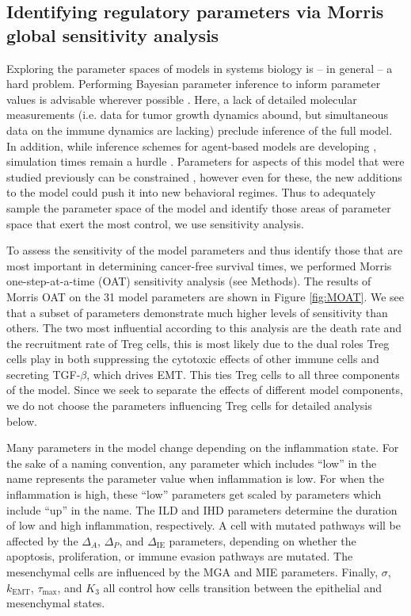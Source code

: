 \documentclass[11pt]{article}
\begin{document}
\subsection{Identifying regulatory parameters via Morris global sensitivity analysis}\label{SensAnalysis}
Exploring the parameter spaces of models in systems biology is -- in general -- a hard problem. Performing Bayesian parameter inference to inform parameter values is advisable wherever possible \cite{kirk13_model}. Here, a lack of detailed molecular measurements  (i.e. data for tumor growth dynamics abound, but simultaneous data on the immune dynamics are lacking) preclude inference of the full model. In addition, while inference schemes for agent-based models are developing \cite{gallaher17_hybrid, warne19_simulation}, simulation times remain a hurdle \cite{lambert18_bayesian}. Parameters for aspects of this model that were studied previously can be constrained \cite{guo17_multiscale}, however even for these, the new additions to the model could push it into new behavioral regimes. Thus to adequately sample the parameter space of the model and identify those areas of parameter space that exert the most control, we use sensitivity analysis.   
\par
To assess the sensitivity of the model parameters and thus identify those that are most important in determining cancer-free survival times, we performed Morris one-step-at-a-time (OAT) sensitivity analysis (see Methods). 
The results of Morris OAT on the 31 model parameters are shown in Figure \ref{fig:MOAT}. We see that a subset of parameters demonstrate much higher levels of sensitivity than others.
The two most influential according to this analysis are the death rate and the recruitment rate of Treg cells, this is most likely due to the dual roles Treg cells play in both suppressing the cytotoxic effects of other immune cells and secreting TGF-$\beta$, which drives EMT.
This ties Treg cells to all three components of the model.
Since we seek to separate the effects of different model components, we do not choose the parameters influencing Treg cells for detailed analysis below.
\par 
Many parameters in the model change depending on the inflammation state.
For the sake of a naming convention, any parameter which includes ``low'' in the name represents the parameter value when inflammation is low.
For when the inflammation is high, these ``low'' parameters get scaled by parameters which include ``up'' in the name.
The ILD and IHD parameters determine the duration of low and high inflammation, respectively.
A cell with mutated pathways will be affected by the $\Delta_A$, $\Delta_P$, and $\Delta_{\text{IE}}$ parameters, depending on whether the apoptosis, proliferation, or immune evasion pathways are mutated.
The mesenchymal cells are influenced by the MGA and MIE parameters.
Finally, $\sigma$, $k_\text{EMT}$, $\tau_\text{max}$, and $K_3$ all control how cells transition between the epithelial and mesenchymal states.
\end{document}
